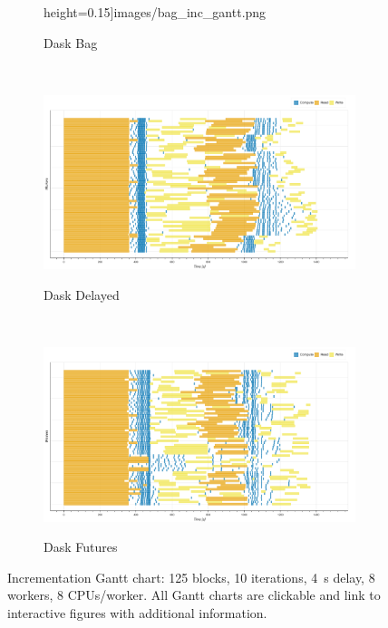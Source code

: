 \documentclass[conference]{IEEEtran}
\begin{document}
\begin{figure}[!b]
\begin{subfigure}[b]{\columnwidth}
{        height=0.15\textheight]{images/bag_inc_gantt.png}}
        \caption{Dask Bag}\label{fig:inc_dask_bag_gantt}
    \end{subfigure}
    \\
    \begin{subfigure}[b]{\columnwidth}
        \href{https://mathdugre.github.io/paper-big-data-engines/dask-delayed-inc-baseline.html}{
        \includegraphics[clip,width=\columnwidth,
        height=0.15\textheight]{images/delayed_inc_gantt.png}}
        \caption{Dask Delayed}\label{fig:inc_dask_delayed_gantt}
    \end{subfigure}
    \\
    \begin{subfigure}[b]{\columnwidth}
        \href{https://mathdugre.github.io/paper-big-data-engines/dask-futures-inc-baseline.html}{
        \includegraphics[clip,width=\columnwidth,
        height=0.15\textheight]{images/futures_inc_gantt.png}}
        \caption{Dask Futures}\label{fig:inc_dask_futures_gantt}
    \end{subfigure}
    \caption{Incrementation Gantt chart: 125 blocks, 10 iterations, \SI{4}{\second} delay, 8 workers,
8 CPUs/worker. All Gantt charts are clickable and link to interactive figures with additional information.}\label{fig:inc_gantt}
\end{figure}
\end{document}
